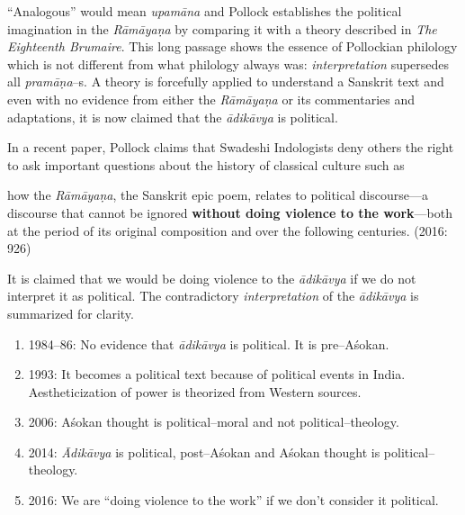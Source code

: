 “Analogous” would mean \textit{upamāna }and Pollock establishes the political imagination in the \textit{Rāmāyaṇa }by comparing it with a theory described in \textit{The Eighteenth Brumaire}. This long passage shows the essence of Pollockian philology which is not different from what philology always was: \textit{interpretation} supersedes all \textit{pramāṇa}–s. A theory is forcefully applied to understand a Sanskrit text and even with no evidence from either the \textit{Rāmāyaṇa} or its commentaries and adaptations, it is now claimed that the \textit{ādikāvya }is political.


In a recent paper, Pollock claims that Swadeshi Indologists deny others the right to ask important questions about the history of classical culture such as


\newpage

\begin{myquote}
how the \textit{Rāmāyaṇa}, the Sanskrit epic poem, relates to political discourse—a discourse that cannot be ignored \textbf{without doing violence to the work}—both at the period of its original composition and over the following centuries. (2016: 926)
\end{myquote}

It is claimed that we would be doing violence to the \textit{ādikāvya} if we do not interpret it as political. The contradictory \textit{interpretation} of the \textit{ādikāvya }is summarized for clarity.

\begin{enumerate}
\itemsep=0pt
\item 1984–86: No evidence that \textit{ādikāvya }is political. It is pre–Aśokan.

 \item 1993: It becomes a political text because of political events in India. Aestheticization of power is theorized from Western sources.

 \item 2006: Aśokan thought is political–moral and not political–theology.

 \item 2014: \textit{Ādikāvya }is political, post–Aśokan and Aśokan thought is political–theology.

 \item 2016: We are “doing violence to the work” if we don’t consider it political.

\end{enumerate}

